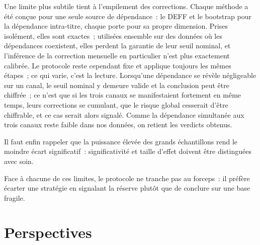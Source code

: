 Une limite plus subtile tient à l'empilement des corrections. Chaque méthode a
été conçue pour une seule source de dépendance~: le DEFF et le bootstrap pour
la dépendance intra-titre, chaque porte pour sa propre dimension. Prises
isolément, elles sont exactes~; utilisées ensemble sur des données où les
dépendances coexistent, elles perdent la garantie de leur seuil nominal, et
l'inférence de la correction mensuelle en particulier n'est plus exactement
calibrée. Le protocole reste cependant fixe et applique toujours les mêmes
étapes~; ce qui varie, c'est la lecture. Lorsqu'une dépendance se révèle
négligeable sur un canal, le seuil nominal y demeure valide et la conclusion
peut être chiffrée~; ce n'est que si les trois canaux se manifestaient
fortement en même temps, leurs corrections se cumulant, que le risque global
cesserait d'être chiffrable, et ce cas serait alors signalé. Comme la
dépendance simultanée aux trois canaux reste faible dans nos données, on
retient les verdicts obtenus.

Il faut enfin rappeler que la puissance élevée des grands échantillons rend le
moindre écart significatif~: significativité et taille d'effet doivent être
distinguées avec soin.

Face à chacune de ces limites, le protocole ne tranche pas au forceps~: il
préfère écarter une stratégie en signalant la réserve plutôt que de conclure
sur une base fragile.

\section{Perspectives}
\label{sec:perspectives}


